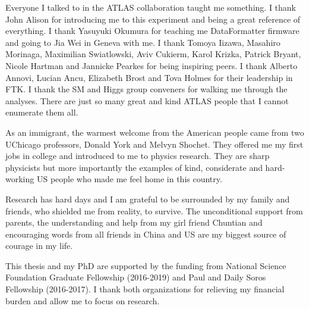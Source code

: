 Everyone I talked to in the ATLAS collaboration taught me something. I thank John Alison for introducing me to this experiment and being a great reference of everything. I thank Yasuyuki Okumura for teaching me DataFormatter firmware and going to Jia Wei in Geneva with me. I thank Tomoya Iizawa, Masahiro Morinaga, Maximilian Swiatlowski, Aviv Cukierm, Karol Krizka, Patrick Bryant, Nicole Hartman and Jannicke Pearkes for being inspiring peers. I thank Alberto Annovi, Lucian Ancu, Elizabeth Brost and Tova Holmes for their leadership in FTK. I thank the SM and Higgs group conveners for walking me through the analyses. There are just so many great and kind ATLAS people that I cannot enumerate them all.

As an immigrant, the warmest welcome from the American people came from two UChicago professors, Donald York and Melvyn Shochet. They offered me my first jobs in college and introduced to me to physics research. They are sharp physicists but more importantly the examples of kind, considerate and hard-working US people who made me feel home in this country.

Research has hard days and I am grateful to be surrounded by my family and friends, who shielded me from reality, to survive. The unconditional support from parents, the understanding and help from my girl friend Chuntian and encouraging words from all friends in China and US are my biggest source of courage in my life.

This thesis and my PhD are supported by the funding from National Science Foundation Graduate Fellowship (2016-2019) and Paul and Daily Soros Fellowship (2016-2017). I thank both organizations for relieving my financial burden and allow me to focus on research.
